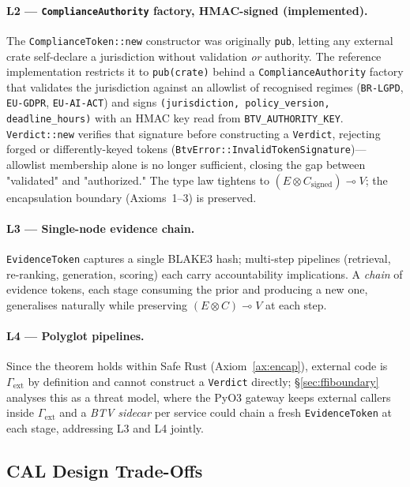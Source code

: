\paragraph*{L2 — \texttt{ComplianceAuthority} factory, HMAC-signed
(implemented).}
The \texttt{ComplianceToken::new} constructor was originally
\texttt{pub}, letting any external crate self-declare a jurisdiction
without validation \emph{or} authority. The reference implementation
restricts it to \texttt{pub(crate)} behind a \texttt{ComplianceAuthority}
factory that validates the jurisdiction against an allowlist of
recognised regimes (\texttt{BR-LGPD}, \texttt{EU-GDPR},
\texttt{EU-AI-ACT}) and signs \texttt{(jurisdiction, policy\_version,
deadline\_hours)} with an HMAC key read from
\texttt{BTV\_AUTHORITY\_KEY}. \texttt{Verdict::new} verifies that
signature before constructing a \texttt{Verdict}, rejecting forged or
differently-keyed tokens
(\texttt{BtvError::InvalidTokenSignature})---allowlist membership
alone is no longer sufficient, closing the gap
between "validated" and "authorized." The type law tightens to
$(E \otimes C_{\text{signed}}) \multimap V$; the encapsulation
boundary (Axioms~1--3) is preserved.

\paragraph*{L3 — Single-node evidence chain.}
\texttt{EvidenceToken} captures a single BLAKE3 hash; multi-step
pipelines (retrieval, re-ranking, generation, scoring) each carry
accountability implications. A \emph{chain} of evidence tokens, each
stage consuming the prior and producing a new one, generalises
naturally while preserving $(E \otimes C) \multimap V$ at each step.

\paragraph*{L4 — Polyglot pipelines.}
Since the theorem holds within Safe Rust (Axiom~\ref{ax:encap}),
external code is $\Gamma_{\text{ext}}$ by definition and cannot
construct a \texttt{Verdict} directly; \S\ref{sec:ffiboundary}
analyses this as a threat model, where the PyO3 gateway keeps
external callers inside $\Gamma_{\text{ext}}$ and a \emph{BTV
sidecar} per service could chain a fresh \texttt{EvidenceToken} at
each stage, addressing L3 and L4 jointly.

\subsection{CAL Design Trade-Offs}
\label{sec:cal}

